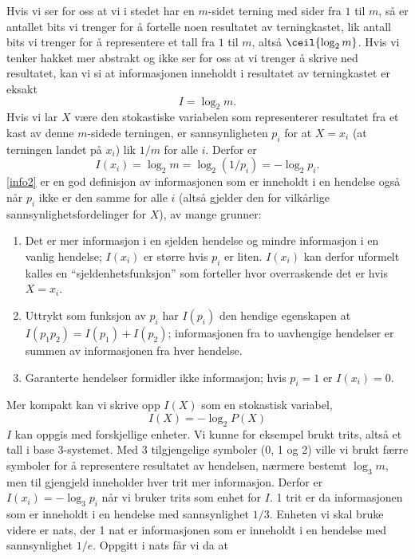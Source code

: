 Hvis vi ser for oss at vi i stedet har en $m$-sidet terning med sider fra $1$ til $m$, så er antallet bits vi trenger for å fortelle noen resultatet av terningkastet, lik antall bits vi trenger for å representere et tall fra $1$ til $m$, altså $\ceil{\log_2 m}$. Hvis vi tenker hakket mer abstrakt og ikke ser for oss at vi trenger å skrive ned resultatet, kan vi si at informasjonen inneholdt i resultatet av terningkastet er eksakt 
\begin{equation}
	I=\log_2 m.
\end{equation}
Hvis vi lar $X$ være den stokastiske variabelen som representerer resultatet fra et kast av denne $m$-sidede terningen, er sannsynligheten $p_i$ for at $X=x_i$ (at terningen landet på $x_i$) lik $1/m$ for alle $i$. Derfor er
\begin{equation}
	\label{info2}
	I(x_i)=\log_2 m=\log_2 (1/p_i)=-\log_2 p_i.
\end{equation}
\eqref{info2} er en god definisjon av informasjonen som er inneholdt i en hendelse også når $p_i$ ikke er den samme for alle $i$ (altså gjelder den for vilkårlige sannsynlighets\-fordelinger for $X$), av mange grunner: 
\begin{enumerate}
	\item Det er mer informasjon i en sjelden hendelse og mindre informasjon i en vanlig hendelse; $I(x_i)$ er større hvis $p_i$ er liten. $I(x_i)$ kan derfor uformelt kalles en ``sjeldenhetsfunksjon'' som forteller hvor overraskende det er hvis $X=x_i$. 
	\item Uttrykt som funksjon av $p_i$ har $I(p_i)$ den hendige egenskapen at $I(p_1p_2)=I(p_1) + I(p_2)$; informasjonen fra to uavhengige hendelser er summen av informasjonen fra hver hendelse.
	\item Garanterte hendelser formidler ikke informasjon; hvis $p_i=1$ er $I(x_i)=0$.
\end{enumerate}
Mer kompakt kan vi skrive opp $I(X)$ som en stokastisk variabel,
\begin{equation}
	I(X)=-\log_2 P(X)
\end{equation}
$I$ kan oppgis med forskjellige enheter. Vi kunne for eksempel brukt trits, altså et tall i base 3-systemet. Med 3 tilgjengelige symboler (0, 1 og 2) ville vi brukt færre symboler for å representere resultatet av hendelsen, nærmere bestemt $\log_3 m$, men til gjengjeld inneholder hver trit mer informasjon. Derfor er $I(x_i)=-\log_3 p_i$ når vi bruker trits som enhet for $I$. 1 trit er da informasjonen som er inneholdt i en hendelse med sannsynlighet $1/3$. Enheten vi skal bruke videre er nats, der 1 nat er informasjonen som er inneholdt i en hendelse med sannsynlighet $1/e$. Oppgitt i nats får vi da at
